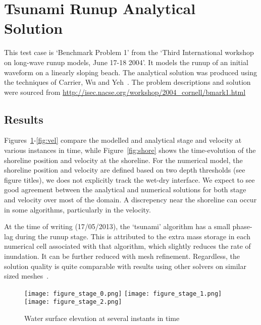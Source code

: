\section{Tsunami Runup Analytical Solution}

This test case is `Benchmark Problem 1' from the `Third International workshop
on long-wave runup models, June 17-18 2004'. It models the runup of an initial
waveform on a linearly sloping beach. The analytical solution was produced 
using the techniques of Carrier, Wu and Yeh~\cite{CGY2003}. The problem descriptions 
and solution were sourced from \url{http://isec.nacse.org/workshop/2004\_cornell/bmark1.html}

\subsection{Results}

Figures~\ref{fig:stage}-\ref{fig:vel} compare the modelled and analytical stage
and velocity at various instances in time, while Figure~\ref{fig:shore} shows
the time-evolution of the shoreline position and velocity at the shoreline. For
the numerical model, the shoreline position and velocity are defined based on
two depth thresholds (see figure titles), we \anuga{} does not explicitly track
the wet-dry interface. We expect to see good agreement between the analytical
and numerical solutions for both stage and velocity over most of the domain.  A
discrepency near the shoreline can occur in some \anuga{} algorithms,
particularly in the velocity.

At the time of writing (17/05/2013), the `tsunami' algorithm has a small
phase-lag during the runup stage. This is attributed to the extra mass storage
in each numerical cell associated with that algorithm, which slightly reduces
the rate of inundation. It can be further reduced with mesh refinement.
Regardless, the solution quality is quite comparable with results using
other solvers on similar sized meshes~\cite{CCM2013,P2012}. 

\begin{figure}
\begin{center}
\texttt{[image: figure\_stage\_0.png]}
\texttt{[image: figure\_stage\_1.png]}
\texttt{[image: figure\_stage\_2.png]}
\caption{Water surface elevation at several instants in time}
\label{fig:stage}
\end{center}
\end{figure}

